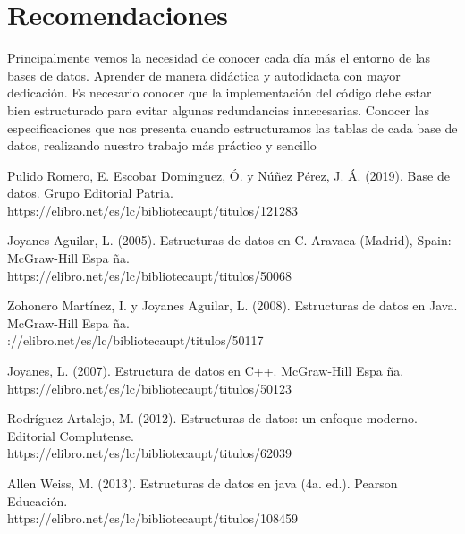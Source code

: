 \documentclass[12pt,letterpaper]{article}
\begin{document}
\section{Recomendaciones}
Principalmente vemos la necesidad de conocer cada dí­a más el entorno de las bases de datos. Aprender de manera didáctica y autodidacta con mayor dedicación.
Es necesario conocer que la implementación del código debe estar bien estructurado para evitar algunas redundancias innecesarias.
Conocer las especificaciones que nos presenta cuando estructuramos las tablas de cada base de datos, realizando nuestro trabajo más práctico y sencillo

\begin{thebibliography}{XXX0000}
 Pulido Romero, E. Escobar Domí­nguez, Ó. y Núñez Pérez, J. Á.  (2019). Base de datos. Grupo Editorial Patria. \\https://elibro.net/es/lc/bibliotecaupt/titulos/121283

 Joyanes Aguilar, L. (2005). Estructuras de datos en C. Aravaca (Madrid), Spain: McGraw-Hill Espa ña. \\https://elibro.net/es/lc/bibliotecaupt/titulos/50068

 Zohonero Martí­nez, I. y Joyanes Aguilar, L. (2008). Estructuras de datos en Java. McGraw-Hill Espa ña. \\://elibro.net/es/lc/bibliotecaupt/titulos/50117

 Joyanes, L. (2007). Estructura de datos en C++. McGraw-Hill Espa ña. \\https://elibro.net/es/lc/bibliotecaupt/titulos/50123

 Rodrí­guez Artalejo, M. (2012). Estructuras de datos: un enfoque moderno. Editorial Complutense. \\https://elibro.net/es/lc/bibliotecaupt/titulos/62039

 Allen Weiss, M. (2013). Estructuras de datos en java (4a. ed.). Pearson Educación. \\https://elibro.net/es/lc/bibliotecaupt/titulos/108459

\end{thebibliography}
\end{document}
